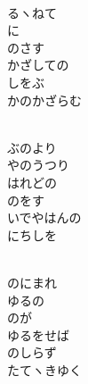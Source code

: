 \documentclass[10pt,b5j]{tarticle} %
\begin{document}
\vspace{1.5em} %
\newcommand{\linespace}{0.5em} %
\newcommand{\blocksize}{0.5\hsize} %
\newcommand{\itemmargin}{6em} %
\begin{enumerate} %
    \setlength{\itemindent}{\itemmargin} %
    \begin{minipage}[c]{\blocksize}
    
        \vspace{\linespace}
        \item~\\
        るヽねて\\
        に\\
        のさす\\
        かざしての\\
        しをぶ\\
        かのかざらむ
        
        \vspace{\linespace}
        \item~\\
        ぶのより\\
        やのうつり\\
        はれどの\\
        のをす\\
        いでやはんの\\
        にちしを
        
        \vspace{\linespace}
        \item~\\
        のにまれ\\
        ゆるの\\
        のが\\
        ゆるをせば\\
        のしらず\\
        たてヽきゆく
        

\end{minipage}
\end{enumerate}
\end{document}
